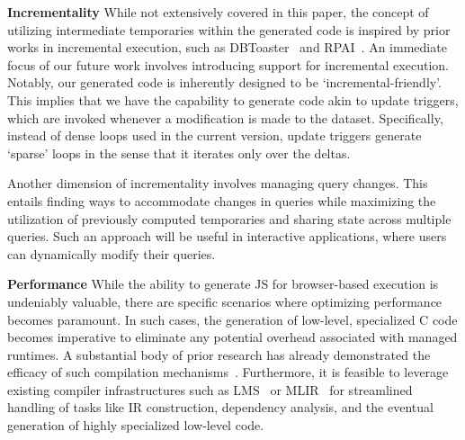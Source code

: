 \documentclass[runningheads]{llncs}
\newcommand{\lang}{Rhyme}
\begin{document}
\textbf{Incrementality}
While not extensively covered in this paper, the concept of utilizing
intermediate temporaries within the generated code is inspired by prior
works in incremental execution, such as DBToaster~\cite{dbtoaster_vldb}
and RPAI~\cite{rpai}.
An immediate focus of our future work involves introducing support for
incremental execution.
Notably, our generated code is inherently designed to be `incremental-friendly'.
This implies that we have the capability to generate code akin to update
triggers, which are invoked whenever a modification is made to the dataset.
Specifically, instead of dense loops used in the current version, update triggers
generate `sparse' loops in the sense that it iterates only over the deltas.

Another dimension of incrementality involves managing query changes.
This entails finding ways to accommodate changes in queries while maximizing
the utilization of previously computed temporaries and sharing state across
multiple queries. 
Such an approach will be useful in interactive applications, where users
can dynamically modify their queries.

\textbf{Performance}
While the ability to generate JS for browser-based execution is undeniably valuable,
there are specific scenarios where optimizing performance becomes paramount.
In such cases, the generation of low-level, specialized C code becomes imperative to
eliminate any potential overhead associated with managed runtimes.
A substantial body of prior research has already demonstrated the efficacy of
such compilation mechanisms~\cite{500lines,lb2,flare_osdi,sai_guannan}.
Furthermore, it is feasible to leverage existing compiler infrastructures such
as LMS~\cite{lms} or MLIR~\cite{mlir} for streamlined handling of tasks like
IR construction, dependency analysis, and the eventual generation of highly
specialized low-level code.




%
%



\end{document}
